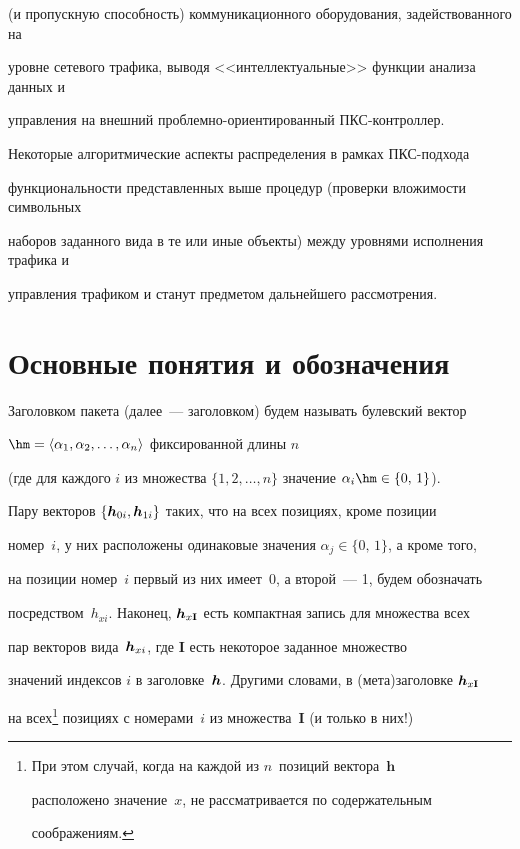 (и пропускную способность) коммуникационного оборудования, задействованного на 

уровне сетевого трафика, выводя <<интеллектуальные>> функции анализа данных и 

управления на внешний проб\-лем\-но-ори\-ен\-ти\-ро\-ван\-ный ПКС-кон\-трол\-лер.

     

     Некоторые алгоритмические аспекты распределения в рамках ПКС-под\-хо\-да 

функциональности представленных выше процедур (проверки вложимости символьных 

наборов заданного вида в те или иные объекты) между уровнями исполнения трафика и 

управления трафиком и станут предметом дальнейшего рассмотрения.

     



\section{Основные понятия и обозначения}



     Заголовком пакета (далее~--- заголовком) будем называть булевский вектор 

\bih\;$\hm = \langle \alpha_1, \alpha_2, \ldots , \alpha_n\rangle$ фиксированной длины $n$ 

(где для каждого $i$ из множества $\{1, 2, \ldots , n\}$ значение $\alpha_i\hm\in\{0,\,1\}$). 

Пару векторов $\{\mbox{{\boldmath${h}$}}_{0i}, \mbox{{\boldmath${h}$}}_{1i}\}$ таких, что на всех позициях, кроме позиции 

номер~$i$, у них расположены одинаковые значения $\alpha_j \in\{0,\,1\}$, а кроме того, 

на позиции номер~$i$ первый из них имеет~0, а второй~--- 1, будем обозначать 

посредством~${h}_{xi}$. Наконец, $\mbox{{\boldmath${h}$}}_{x\mathbf{I}}$ есть компактная запись для множества всех 

пар векторов вида~$\mbox{{\boldmath${h}$}}_{xi}$, где $\mathbf{I}$ есть некоторое заданное множество 

значений индексов $i$ в заголовке~$\mbox{{\boldmath${h}$}}$. Другими словами, в (мета)заголовке $\mbox{{\boldmath${h}$}}_{x\mathbf{I}}$ 

на всех\footnote{При этом случай, когда на каждой из $n$~позиций вектора~$\mathbf{h}$ 

расположено значение~${x}$, не рассматривается по содержательным 

соображениям.} позициях с номерами~$i$ из множества~$\mathbf{I}$ (и только в них!) 

